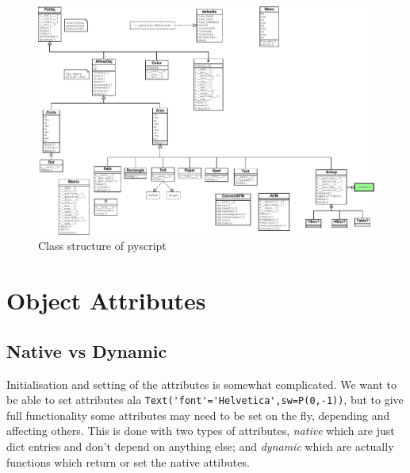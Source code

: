 \documentclass[a4paper]{book}
\begin{document}
\begin{figure}[h]
  \begin{center}
    \begin{sideways}
      \includegraphics[height=.9\textwidth]{class_structure}
    \end{sideways}
  \end{center}
  \caption{Class structure of pyscript}
  \label{fig:classes}
\end{figure}

\section{Object Attributes}
\label{sec:attributes}


\subsection{Native vs Dynamic}
\label{sec:native-vs-dynamic}

Initialisation and setting of the attributes is somewhat complicated.  We
want to be able to set attributes ala
\Verb|Text('font'='Helvetica',sw=P(0,-1))|, but to give full functionality
some attributes may need to be set on the fly, depending and affecting
others.  This is done with two types of attributes, \emph{native} which are
just dict entries and don't depend on anything else; and \emph{dynamic}
which are actually functions which return or set the native attibutes.
\end{document}

